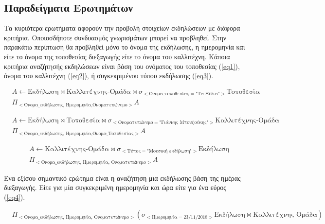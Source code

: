 \subsection{Παραδείγματα Ερωτημάτων}

Τα κυριότερα ερωτήματα αφορούν την προβολή στοιχείων εκδηλώσεων με
διάφορα κριτήρια. Οποιοσδήποτε συνδυασμός γνωρισμάτων μπορεί να
προβληθεί. Στην παρακάτω περίπτωση θα προβληθεί μόνο το όνομα της
εκδήλωσης, η ημερομηνία και είτε το όνομα της τοποθεσίας διεξαγωγής
είτε το όνομα του καλλιτέχνη.  Κάποια κριτήρια αναζήτησής εκδηλώσεων
είναι βάση του ονόματος του τοποθεσίας (\ref{eq1}), όνομα του
καλλιτέχνη (\ref{eq2}), ή συγκεκριμένου τύπου εκδήλωσης (\ref{eq3}).

\begin{equation} \label{eq1}
\begin{split}
&A \leftarrow \text{Εκδήλωση} \bowtie
\text{Καλλιτέχνης-Ομάδα} \bowtie
\sigma_{<\text{Όνομα\_τοποθεσίας} = \text{"Τα Ξύδια"}>}
\text{Τοποθεσία}
\\
&\Pi_{<\text{Όνομα\_εκδήλωσης, Ημερομηνία,Ονοματεπώνυμο}>}A
\end{split}
\end{equation}

\begin{equation} \label{eq2}
\begin{split}
&A \leftarrow \text{Εκδήλωση} \bowtie
\text{Τοποθεσία} \bowtie
\sigma_{<\text{Ονοματεπώνυμο} = \text{"Γιάννης Μπουζούκης"}>}
\text{Καλλιτέχνης-Ομάδα}
\\
&\Pi_{<\text{Όνομα\_εκδήλωσης, Ημερομηνία,Όνομα\_Τοποθεσίας}>}A
\end{split}
\end{equation}

\begin{equation} \label{eq3}
\begin{split}
&A \leftarrow \text{Καλλιτέχνης-Ομάδα} \bowtie
\sigma_{<\text{Τύπος} = \text{"Μουσική εκδήλωση"}>}\text{Εκδήλωση}
\\
&\Pi_{<\text{Όνομα\_εκδήλωσης, Ημερομηνία, Ονοματεπώνυμο}>}A
\end{split}
\end{equation}

Ένα εξίσου σημαντικό ερώτημα  είναι η αναζήτηση μια εκδήλωσης βάση της
ημέρας διεξαγωγής. Είτε για μία συγκεκριμένη ημερομηνία και ώρα είτε
για ένα εύρος (\ref{eq4}).

\begin{equation}
  \label{eq4}
  \begin{split}
    &\Pi_{<\text{Όνομα\_εκδήλωσης, Ημερομηνία, Ονοματεπώνυμο}>}(
    \sigma_{<\text{Ημερομηνία} = 23/11/2018>} \text{Εκδήλωση} \bowtie
    \text{Καλλιτέχνης-Ομάδα})
  \end{split}
\end{equation}

